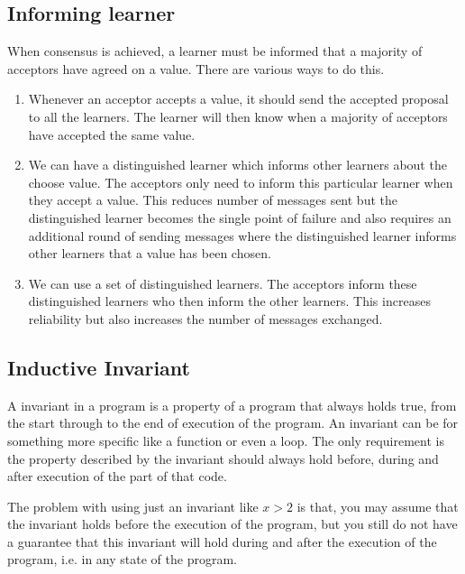 
\vspace{-4mm}
\subsection{Informing learner}
When consensus is achieved, a learner must be informed that a majority of acceptors
have agreed on a value. There are various ways to do this.

\begin{enumerate}
  \item Whenever an acceptor accepts a value, it should send the accepted proposal
    to all the learners. The learner will then know when a majority of acceptors
    have accepted the same value.
  \item We can have a distinguished learner which informs other learners about
    the choose value. The acceptors only need to inform this particular learner
    when they accept a value. This reduces number of messages sent but the
    distinguished learner becomes the single point of failure and also requires
    an additional round of sending messages where the distinguished learner informs
    other learners that a value has been chosen.
  \item We can use a set of distinguished learners. The acceptors inform these
    distinguished learners who then inform the other learners. This increases
    reliability but also increases the number of messages exchanged.
\end{enumerate}


\subsection{Inductive Invariant}
A invariant in a program is a property of a program that always holds true,
from the start through to the end of execution of the program. An invariant can be for something
more specific like a function or even a loop. The only requirement is the property
described by the invariant should always hold before, during and after execution
of the part of that code.

The problem with using just an invariant like $x > 2$ is that, you may assume
that the invariant holds before the execution of the program, but you still
do not have a guarantee that this invariant will hold during and after the
execution of the program, i.e. in any state of the program.

